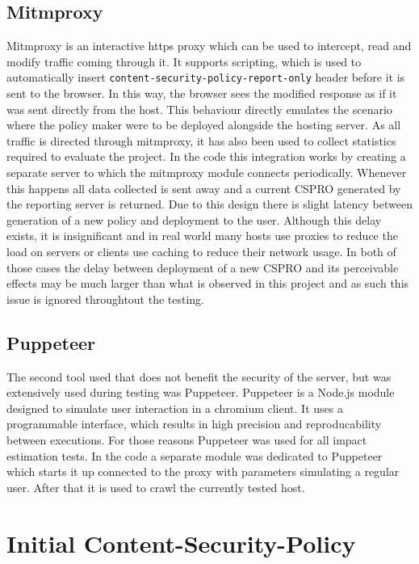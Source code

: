 \subsection{Mitmproxy}
Mitmproxy is an interactive https proxy which can be used to intercept, read and modify traffic coming through it.
It supports scripting, which is used to automatically insert \texttt{content-security-policy-report-only} header before it is sent to the browser.
In this way, the browser sees the modified response as if it was sent directly from the host.
This behaviour directly emulates the scenario where the policy maker were to be deployed alongside the hosting server.
As all traffic is directed through mitmproxy, it has also been used to collect statistics required to evaluate the project.
In the code this integration works by creating a separate server to which the mitmproxy module connects periodically.
Whenever this happens all data collected is sent away and a current CSPRO generated by the reporting server is returned.
Due to this design there is slight latency between generation of a new policy and deployment to the user.
Although this delay exists, it is insignificant and in real world many hosts use proxies to reduce the load on servers or clients use caching to reduce their network usage.
In both of those cases the delay between deployment of a new CSPRO and its perceivable effects may be much larger than what is observed in this project and as such this issue is ignored throughtout the testing.

\subsection{Puppeteer}
The second tool used that does not benefit the security of the server, but was extensively used during testing was Puppeteer.
Puppeteer is a Node.js module designed to simulate user interaction in a chromium client.
It uses a programmable interface, which results in high precision and reproducability between executions.
For those reasons Puppeteer was used for all impact estimation tests.
In the code a separate module was dedicated to Puppeteer which starts it up connected to the proxy with parameters simulating a regular user.
After that it is used to crawl the currently tested host.


\section{Initial Content-Security-Policy}

